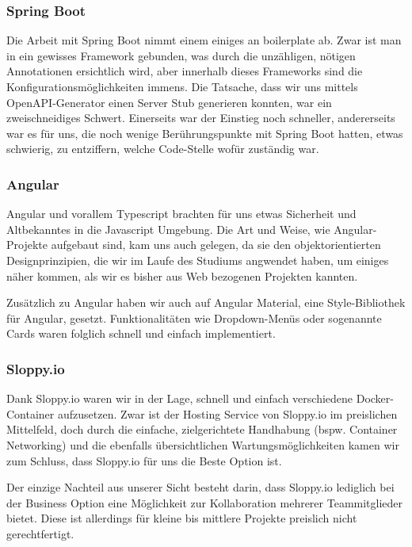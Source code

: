 \documentclass[../main.tex]{subfiles}
\begin{document}
	\subsubsection{Spring Boot}
	Die Arbeit mit Spring Boot nimmt einem einiges an \gls{boilerplate} ab. Zwar ist man in ein gewisses Framework gebunden, was durch die unzähligen, nötigen Annotationen ersichtlich wird, aber innerhalb dieses Frameworks sind die Konfigurationsmöglichkeiten immens. Die Tatsache, dass wir uns mittels OpenAPI-Generator einen Server Stub generieren konnten, war ein zweischneidiges Schwert. Einerseits war der Einstieg noch schneller, andererseits war es für uns, die noch wenige Berührungspunkte mit Spring Boot hatten, etwas schwierig, zu entziffern, welche Code-Stelle wofür zuständig war.
	
	\subsubsection{Angular}
	Angular und vorallem Typescript brachten für uns etwas Sicherheit und Altbekanntes in die Javascript Umgebung. Die Art und Weise, wie Angular-Projekte aufgebaut sind, kam uns auch gelegen, da sie den objektorientierten Designprinzipien, die wir im Laufe des Studiums angwendet haben, um einiges näher kommen, als wir es bisher aus Web bezogenen Projekten kannten.
	
	\noindent Zusätzlich zu Angular haben wir auch auf Angular Material, eine Style-Bibliothek für Angular, gesetzt. Funktionalitäten wie Dropdown-Menüs oder sogenannte Cards waren folglich schnell und einfach implementiert.
	
	\subsubsection{Sloppy.io}
	Dank Sloppy.io waren wir in der Lage, schnell und einfach verschiedene Docker-Container aufzusetzen. Zwar ist der Hosting Service von Sloppy.io im preislichen Mittelfeld, doch durch die einfache, zielgerichtete Handhabung (bspw. Container Networking) und die ebenfalls übersichtlichen Wartungsmöglichkeiten kamen wir zum Schluss, dass Sloppy.io für uns die Beste Option ist.
	
	\noindent Der einzige Nachteil aus unserer Sicht besteht darin, dass Sloppy.io lediglich bei der Business Option eine Möglichkeit zur Kollaboration mehrerer Teammitglieder bietet. Diese ist allerdings für kleine bis mittlere Projekte preislich nicht gerechtfertigt.
	
\end{document}
